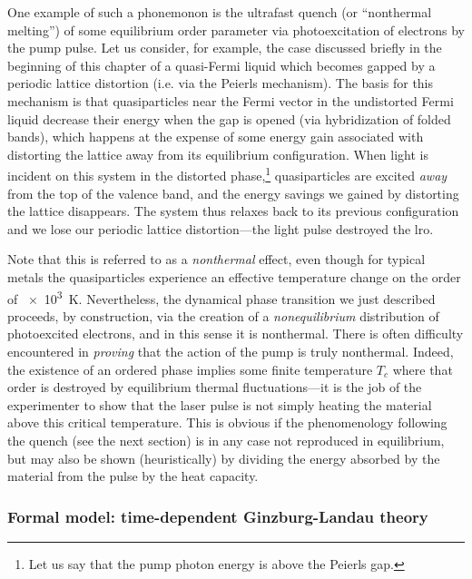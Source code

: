 One example of such a phonemonon is the ultrafast quench (or ``nonthermal melting'') of some equilibrium order parameter via photoexcitation of electrons by the pump pulse.
Let us consider, for example, the case discussed briefly in the beginning of this chapter of a quasi-\oned Fermi liquid which becomes gapped by a periodic lattice distortion (i.e. via the Peierls mechanism).
The basis for this mechanism is that quasiparticles near the Fermi vector in the undistorted Fermi liquid decrease their energy when the gap is opened (via hybridization of folded bands), which happens at the expense of some energy gain associated with distorting the lattice away from its equilibrium configuration.
When light is incident on this system in the distorted phase,\footnote{Let us say that the pump photon energy is above the Peierls gap.} quasiparticles are excited \emph{away} from the top of the valence band, and the energy savings we gained by distorting the lattice disappears.
The system thus relaxes back to its previous configuration and we lose our periodic lattice distortion---the light pulse destroyed the \gls{lro}.

Note that this is referred to as a \emph{nonthermal} effect, even though for typical metals the quasiparticles experience an effective temperature change on the order of \qty{e3}{K}\citep{rethfeld_ultrafast_2002}.
Nevertheless, the dynamical phase transition we just described proceeds, by construction, via the creation of a \emph{nonequilibrium} distribution of photoexcited electrons, and in this sense it is nonthermal.
There is often difficulty encountered in \emph{proving} that the action of the pump is truly nonthermal.
Indeed, the existence of an ordered phase implies some finite temperature $T_c$ where that order is destroyed by equilibrium thermal fluctuations---it is the job of the experimenter to show that the laser pulse is not simply heating the material above this critical temperature.
This is obvious if the phenomenology following the quench (see the next section) is in any case not reproduced in equilibrium, but may also be shown (heuristically) by dividing the energy absorbed by the material from the pulse by the heat capacity.

\subsubsection{Formal model: time-dependent Ginzburg-Landau theory}

